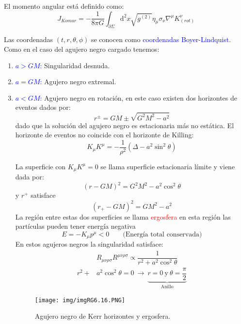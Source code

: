 \documentclass[../main]{subfiles}
\begin{document}
\begin{adjustwidth}{0pt}{-100pt}
El momento angular está definido como:
\begin{equation}
    J_{Komar}=-\dfrac{1}{8\pi G}\int_{\partial \Sigma} \mathrm{d}^2 x \sqrt{g^{(2)}} \eta_{\mu} \sigma_{\nu} \nabla^{\mu} K^{\nu}_{(rot)}
\end{equation}

Las coordenadas $(t, r, \theta, \phi)$ se conocen como \textcolor{blue}{coordenadas Boyer-Lindquist}. Como en el caso del agujero negro cargado tenemos:
\begin{enumerate}
    \item \textcolor{blue}{$a> GM$:} Singularidad desnuda.
    \item \textcolor{blue}{$a = GM$:} Agujero negro extremal.
    \item \textcolor{blue}{$a < GM$:} Agujero negro en rotación, en este caso existen dos horizontes de eventos dados por:
    \begin{equation}
        r^{\pm}=GM\pm \sqrt{G^2M^2-a^2}
    \end{equation}
    dado que la solución del agujero negro es estacionaria más no estática. El horizonte de eventos no coincide con el horizonte de Killing:
    \begin{equation}
        K_{\mu}K^{\mu}=-\dfrac{1}{\rho^2}(\Delta-a^2\sin^2 \theta)
    \end{equation}

    La superficie con $K_{\mu}K^{\mu}=0$ se llama superficie estacionaria límite y viene dada por:
    \begin{equation}
        (r-GM)^2=G^2M^2-a^2\cos^2 \theta
    \end{equation}
    y $r^+$ satisface 
    \begin{equation}
        (r_+-GM)^2=GM^2-a^2
    \end{equation}
    La región entre estas dos superficies se llama \textcolor{red}{ergosfera} en esta región las partículas pueden tener energía negativa
    \begin{equation}
        E=-K_{\mu}p^{\mu}<0 \qquad \text{(Energía total conservada)}
    \end{equation}
    En estos agujeros negros la singularidad satisface:
    \begin{equation}
        \begin{split}
            &R_{\mu\nu\rho\sigma} R^{\mu\nu\rho\sigma} \propto \dfrac{1}{r^2+a^2 \cos^2 \theta}\\
            r^2+&a^2\cos^2 \theta=0 \ \rightarrow \ \underbrace{r=0 \ \text{y} \ \theta=\dfrac{\pi}{2}}_{\text{Anillo}}
        \end{split}
    \end{equation}
    \begin{figure}[H]
        \begin{adjustwidth}{0pt}{-100pt}
        \centering
        \texttt{[image: img/imgRG6.16.PNG]}
        \caption{Agujero negro de Kerr horizontes y ergosfera.}
        \end{adjustwidth}
    \end{figure}
\end{enumerate}


\end{adjustwidth}
\end{document}
